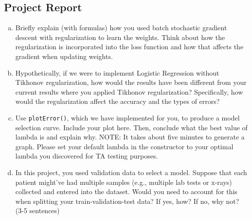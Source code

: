 \documentclass{article}
\begin{document}
\begin{algorithm}
\begin{algorithmic}[1]

    \EndFor
    \Else
    \EndIf
    
\EndWhile
\EndProcedure


\end{algorithmic}
\end{algorithm}

\subsection*{Project Report}
\begin{enumerate}[a.]
    \item Briefly explain (with formulas) how you used batch stochastic gradient descent with regularization to learn the weights. Think about how the regularization is incorporated into the loss function and how that affects the gradient when updating weights. 

%
%
%
%
%
%
    
    
    \item Hypothetically, if we were to implement Logistic Regression without Tikhonov regularization, how would the results have been different from your current results where you applied Tikhonov regularization? Specifically, how would the regularization affect the accuracy and the types of errors?

%
%
%
%
%
%
    
    \item Use \texttt{plotError()}, which we have implemented for you, to produce a model selection curve. Include your plot here. Then, conclude what the best value of lambda is and explain why. NOTE: It takes about five minutes to generate a graph. Please set your default lambda in the constructor to your optimal lambda you discovered for TA testing purposes. 

%
%
%
%
%
%
    
    \item In this project, you used validation data to select a model. Suppose that each patient might've had multiple samples (e.g., multiple lab tests or x-rays) collected and entered into the dataset. Would you need to account for this when splitting your train-validation-test data? If yes, how? If no, why not? (3-5 sentences)

%
%
%
%
%
%
    
\end{enumerate}
\end{document}
